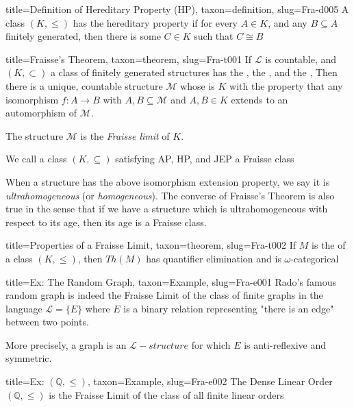 \documentclass[a4paper]{article}
\begin{document}
\begin{tree}{title={Definition of Hereditary Property (HP)}, taxon={definition}, slug={Fra-d005}}
A class \((K, \leq )\) has the hereditary property if for every \(A \in  K\), and any \(B \subseteq  A\) finitely generated, then there is some \(C \in  K\) such that \(C \cong  B\)
\end{tree}

\begin{tree}{title={Fraisse's Theorem}, taxon={theorem}, slug={Fra-t001}}
If \(\mathcal {L}\) is countable, and \((K, \subset )\) a class of finitely generated structures has the , the , and the , 
Then there is a unique, countable structure \(\mathcal {M}\) whose  is \(K\) with the property that any isomorphism \(f:A \rightarrow  B\) with \(A,B \subseteq   \mathcal {M}\) and \(A,B \in  K\) extends to
an automorphism of \(\mathcal {M}\).\par{The structure \(\mathcal {M}\) is the \emph{Fraisse limit} of \(K\).}\par{We call a class \((K, \subseteq )\) satisfying AP, HP, and JEP a Fraisse class}\par{When a structure has the above isomorphism extension property, we say it is \emph{ultrahomogeneous} (or \emph{homogeneous}). 
The converse of Fraisse's Theorem is also true in the sense that if we have a structure which is ultrahomogeneous with respect to its age, then its age is a Fraisse class.}
\end{tree}

\begin{tree}{title={Properties of a Fraisse Limit}, taxon={theorem}, slug={Fra-t002}}
If \(M\) is the  of a class \((K,  \leq )\), then \(Th(M)\) has quantifier elimination and is \(\omega\)-categorical
\end{tree}

\begin{tree}{title={Ex: The Random Graph}, taxon={Example}, slug={Fra-e001}}
Rado's famous random graph is indeed the Fraisse Limit of the class of finite graphs in the language \(\mathcal {L} =  \{ E \}\) where \(E\) is a binary relation representing "there is an edge" between two points.\par{More precisely, a graph is an \(\mathcal {L}-structure\) for which \(E\) is anti-reflexive and symmetric.}
\end{tree}

\begin{tree}{title={Ex: \(( \mathbb {Q},  \leq )\)}, taxon={Example}, slug={Fra-e002}}
The Dense Linear Order \(( \mathbb {Q},  \leq )\) is the Fraisse Limit of the class of all finite linear orders
\end{tree}

\printbibliography
\end{document}
